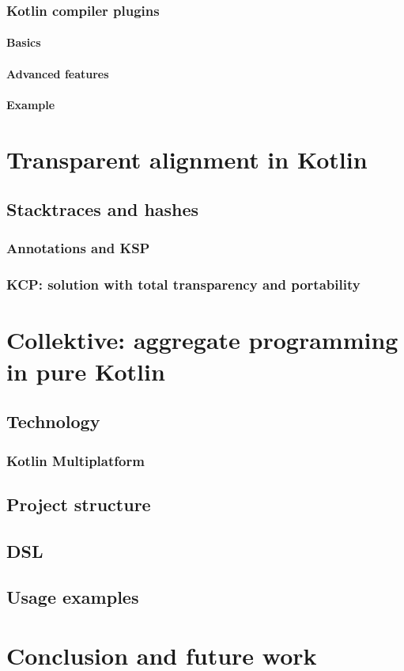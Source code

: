 \subsection{Kotlin compiler plugins}
\subsubsection{Basics}
\subsubsection{Advanced features}
\subsubsection{Example}

\chapter{Transparent alignment in Kotlin}

\section{Stacktraces and hashes}
\subsection{Annotations and KSP}
\subsection{KCP: solution with total transparency and portability}

\chapter{Collektive: aggregate programming in pure Kotlin}

\section{Technology}
\subsection{Kotlin Multiplatform}

\section{Project structure}

\section{DSL}

\section{Usage examples}

\chapter{Conclusion and future work}